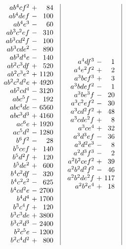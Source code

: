 \[\begin{array}{@{}c|c|c|c@{}}
\begin{array}{r@{\ }c@{\ }r}
ab^4cf^2&+&84\\
ab^4def&-&100\\
ab^4e^3&-&60\\
ab^3c^2ef&-&310\\
ab^3cd^2f&-&100\\
ab^3cde^2&-&890\\
ab^3d^4e&-&140\\
ab^2c^3df&+&520\\
ab^2c^3e^2&+&1120\\
ab^2c^2d^2e&+&4920\\
ab^2cd^4&-&3120\\
abc^5f&-&192\\
abc^4de&-&6560\\
abc^3d^3&+&4160\\
ac^6e&+&1920\\
ac^5d^2&-&1280\\
b^6f^2&-&28\\
b^5cef&+&140\\
b^5d^2f&+&120\\
b^5de^2&+&600\\
b^4c^2df&-&320\\
b^4c^2e^2&-&625\\
b^4cd^2e&-&2700\\
b^4d^4&+&1700\\
b^3c^4f&+&120\\
b^3c^3de&+&3800\\
b^3c^2d^3&-&2400\\
b^2c^5e&-&1200\\
b^2c^4d^2&+&800
\end{array}
&
\begin{array}{r@{\ }c@{\ }r}
a^4df^3&-&1\\
a^4e^2f^2&+&2\\
a^3bcf^3&+&3\\
a^3bdef^2&-&1\\
a^3be^3f&-&20\\
a^3c^2ef^2&-&30\\
a^3cd^2f^2&+&48\\
a^3cde^2f&+&8\\
a^3ce^4&+&32\\
a^3d^3ef&-&36\\
a^3d^2e^3&-&8\\
a^2d^3f^3&-&2\\
a^2b^2cef^2&+&39\\
a^2b^2d^2f^2&-&46\\
a^2b^2de^2f&+&117\\
a^2b^2e^4&+&18\\

\end{array}
\end{array}\]
